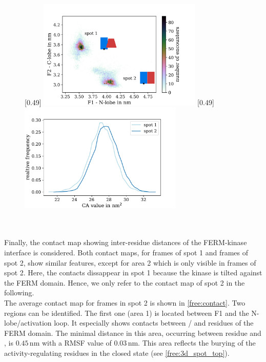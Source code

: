 \begin{figure}[hb]
	\subcaptionbox{\label{free:f2clf1nl}}[0.49\textwidth]{
		\includegraphics[height=5.2cm]{figures/results/free_f1f2_withcartoons}
	}\hfill%
	\subcaptionbox{\label{free:ca}}[0.49\textwidth]{
		\includegraphics[height=5.2cm]{figures/results/free_ca}
	}%
	\label{free:pic_ca_and_com}
\end{figure}
%
%
%
\\
\\ %
Finally, the contact map showing inter-residue distances of the FERM-kinase interface is considered. Both contact maps, for frames of spot 1 and frames of spot 2, show similar features, except for area 2 which is only visible in frames of spot 2. Here, the contacts dissappear in spot 1 because the kinase is tilted against the FERM domain. Hence, we only refer to the contact map of spot 2 in the following.\\
The average contact map for frames in spot 2 is shown in \autoref{free:contact}. Two regions can be identified. The first one (area 1) is located between F1 and the N-lobe/activation loop. It especially shows contacts between / and residues of the FERM domain. The minimal distance in this area, occurring between residue  and , is $0.45\,\si{\nano\metre}$ with a RMSF value of $0.03\,\si{\nano\metre}$. This area reflects the burying of the activity-regulating residues in the closed state (see \autoref{free:3d_spot_top}).\\
